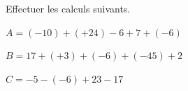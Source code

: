 \documentclass[a4paper]{book}
\begin{document}
    \begin{exemple}
        Effectuer les calculs suivants.

        \medskip

        \begin{minipage}{0.30\linewidth}
            $A=(-10)+(+24)-6+7+(-6)$

            \vspace{3cm}
        \end{minipage}
        \hfill\vline\hfill
        \begin{minipage}{0.30\linewidth}
            $B=17+(+3)+(-6)+(-45)+2$

            \vspace{3cm}
        \end{minipage}
        \hfill\vline\hfill
        \begin{minipage}{0.30\linewidth}
            $C=-5-(-6)+23-17$

            \vspace{3cm}
        \end{minipage}
    \end{exemple}
\end{document}

